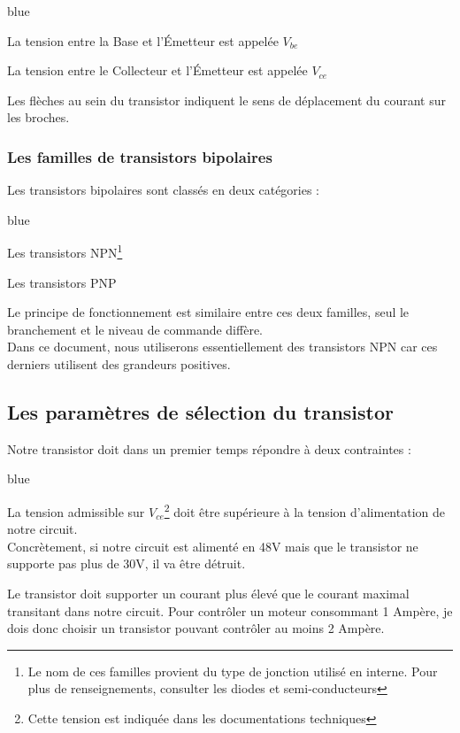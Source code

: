 {\begin{items}{blue}{\Triangle}
  \item La tension entre la Base et l’Émetteur est appelée $V_{be}$
  \item La tension entre le Collecteur et l’Émetteur est appelée $V_{ce}$
\end{items}



Les flèches au sein du transistor indiquent le sens de déplacement du courant sur les broches.

\subsubsection{Les familles de transistors bipolaires}

Les transistors bipolaires sont classés en deux catégories : 

\begin{items}{blue}{\Triangle}

  \item Les transistors NPN\footnote{Le nom de ces familles provient du type de jonction utilisé en interne. Pour plus de renseignements, consulter les diodes et semi-conducteurs}
  \item Les transistors PNP

\end{items}

Le principe de fonctionnement est similaire entre ces deux familles, seul le branchement et le niveau de commande diffère.\\ Dans ce document, nous utiliserons essentiellement des transistors NPN car ces derniers utilisent des grandeurs positives.



\subsection{Les paramètres de sélection du transistor}

Notre transistor doit dans un premier temps répondre à deux contraintes : 

\begin{items}{blue}{\Triangle}

  \item La tension admissible sur $V_{ce}$\footnote{Cette tension est indiquée dans les documentations techniques} doit être supérieure à la tension d'alimentation de notre circuit.\\
  Concrètement, si notre circuit est alimenté en 48V mais que le transistor ne supporte pas plus de 30V, il va être détruit.
  \item Le transistor doit supporter un courant plus élevé que le courant maximal transitant dans notre circuit.
  Pour contrôler un moteur consommant 1 Ampère, je dois donc choisir un transistor pouvant contrôler au moins 2 Ampère.
\end{items}

}
